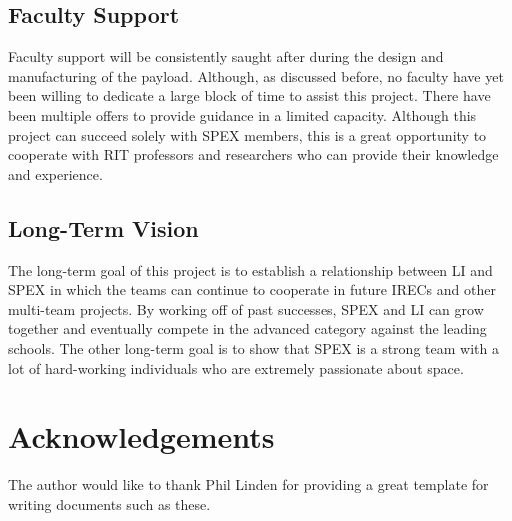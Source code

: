\documentclass[conference]{IEEEtran} %
\begin{document}
\subsection{Faculty Support}
Faculty support will be consistently saught after during the design and manufacturing of the payload. Although, as discussed before,
no faculty have yet been willing to dedicate a large block of time to assist this project. There have been multiple offers to provide
guidance in a limited capacity. Although this project can succeed solely with SPEX members, this is a great opportunity to cooperate
with RIT professors and researchers who can provide their knowledge and experience.

\subsection{Long-Term Vision}
\label{sec:vision}
The long-term goal of this project is to establish a relationship between LI and SPEX in which the teams can continue to cooperate
in future IRECs and other multi-team projects. By working off of past successes, SPEX and LI can grow together and eventually compete in the
advanced category against the leading schools. The other long-term goal is to show that SPEX is a strong team with a lot of hard-working
individuals who are extremely passionate about space.

\section*{Acknowledgements}
The author would like to thank Phil Linden for providing a great template for writing documents such as these.
\onecolumn
\appendices{}
\end{document}
